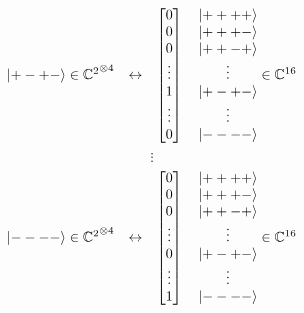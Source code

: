 $$\begin{matrix}
    \left| +-+- \right >\in{\mathbb{C}^2}^{\otimes4}&\leftrightarrow&\begin{bmatrix}
    0\\
    0\\
    0\\
    \vdots\\
    1\\
    \vdots\\
    0
\end{bmatrix}\quad\begin{matrix}
    \left| ++++ \right >\\
    \left| +++- \right >\\
    \left| ++-+ \right >\\
    \vdots\\
    \left| +-+- \right >\\
    \vdots\\
    \left| ---- \right >
\end{matrix}\in\mathbb{C}^{16}
\end{matrix}$$
$$\vdots$$
$$\begin{matrix}
    \left| ---- \right >\in{\mathbb{C}^2}^{\otimes4}&\leftrightarrow&\begin{bmatrix}
    0\\
    0\\
    0\\
    \vdots\\
    0\\
    \vdots\\
    1
\end{bmatrix}\quad\begin{matrix}
    \left| ++++ \right >\\
    \left| +++- \right >\\
    \left| ++-+ \right >\\
    \vdots\\
    \left| +-+- \right >\\
    \vdots\\
    \left| ---- \right >
\end{matrix}\in\mathbb{C}^{16}
\end{matrix}$$



